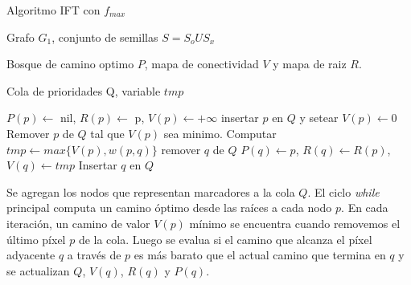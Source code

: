 \begin{algorithm}
    \caption{Algoritmo IFT con $f_{max}$}
    \label{fig:IFTrace-IFT-algorithm}
    \begin{algorithmic}
        \Require\hspace{\algorithmicindent}\hspace{\algorithmicindent}Grafo $G_{1}$, conjunto de semillas $S = S_{o} U S_{x}$

        \Ensure \hspace{\algorithmicindent}\hspace{0.23cm} Bosque de camino optimo $P$, mapa de conectividad $V$
        \State\hspace{\algorithmicindent}\hspace{\algorithmicindent}\hspace{\algorithmicindent}\hspace{0.3cm} y mapa de raiz $R$.

        \Auxiliary\hspace{\algorithmicindent} Cola de prioridades Q, variable $tmp$

        \State

            \State $P(p) \gets$ nil, $R(p) \gets$ p, $V(p) \gets + \infty$
             insertar $p$ en $Q$ y setear $V(p) \gets 0$ \EndIf
        \EndFor
            \State Remover $p$ de $Q$ tal que $V(p)$ sea minimo.
                \State Computar $tmp \gets max\{V(p), w(p,q)\}$
                     remover $q$ de $Q$ \EndIf
                    \State $P(q) \gets p$, $R(q) \gets R(p)$, $V(q) \gets tmp$
                    \State Insertar $q$ en $Q$
                \EndIf
            \EndFor
        \EndWhile
    \end{algorithmic}
\end{algorithm}



Se agregan
los nodos que representan marcadores a la cola $Q$. El ciclo \textit{while}
principal computa un camino óptimo desde las raíces a cada nodo $p$. En
cada iteración, un camino de valor $V(p)$ mínimo se encuentra cuando
removemos el último píxel $p$ de la cola. Luego se evalua si el camino que
alcanza el píxel adyacente $q$ a través de $p$ es más barato que el actual
camino que termina en $q$ y se actualizan $Q$, $V(q)$, $R(q)$ y $P(q)$.

